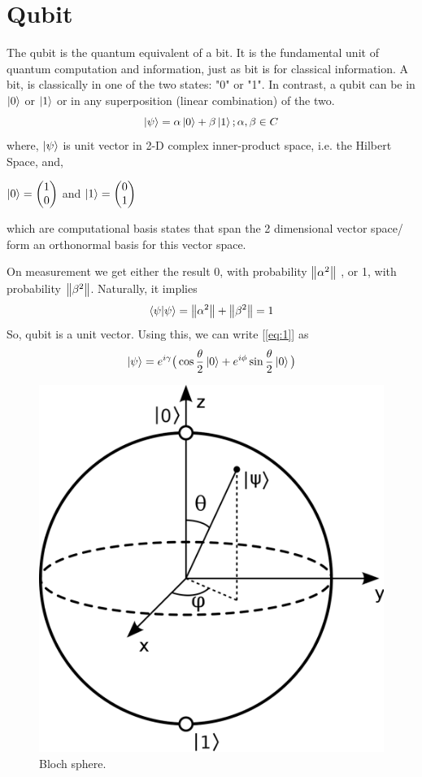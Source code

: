 \documentclass[11.5pt, paper=a4]{article}
\theoremstyle{definition}
\numberwithin{theorem}{section}
\begin{document}
\section{Qubit}
The qubit is the quantum equivalent of a bit. It is the fundamental unit of quantum computation and information, just as bit is for classical information.
A bit, is classically in one of the two states: "0" or "1". In contrast, a qubit can be in $\ket{0}$ or $\ket{1}$ or in any superposition (linear combination) of the two.
\begin{equation} \label{eq:1}
    \ket{\psi} = \alpha \ket{0} + \beta \ket{1}; \alpha, \beta \in C
\end{equation}
where, $\ket{\psi}$ is unit vector in 2-D complex inner-product space, i.e. the Hilbert Space, and, \\
\begin{center}
$\ket{0} =
\begin{pmatrix}
1 \\
0
\end{pmatrix} $ and $\ket{1} =
\begin{pmatrix}
0 \\
1
\end{pmatrix}    $
\end{center}
which are computational basis states that span the 2 dimensional vector space/ form an orthonormal basis for this vector space.

On measurement we get either the result 0, with probability  $\norm{\alpha^2}$ , or 1, with probability $\norm{\beta^2}$. Naturally, it implies
\begin{equation}
\braket{{\psi}|{\psi}}= \norm{\alpha^2}+ \norm{\beta^2} = 1
\end{equation}
So, qubit is a unit vector. Using this, we can write  [\ref{eq:1}] as
\begin{equation}
    \ket{\psi} = e^{i\gamma}\big(\cos{\frac{\theta}{2}}\ket{0} + e^{i\phi} \sin{\frac{\theta}{2}}\ket{0}\big)
\end{equation}
\begin{figure}[h]
\centering
\includegraphics[width=0.4\linewidth]{bloch_sphere.png}
\caption{Bloch sphere. \cite{bloch_sphere}}
\label{fig:Bloch sphere}
\end{figure}
\end{document}
